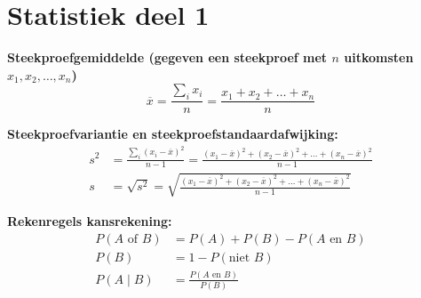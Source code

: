 \vspace{-2cm}
\section*{Statistiek deel 1}
\textbf{Steekproefgemiddelde (gegeven een steekproef met $n$ uitkomsten $x_1, x_2, \ldots, x_n$)}
\[
    \overline{x} = \frac{\sum_{i} x_i}{n} = \frac{x_1 + x_2 + \ldots + x_n}{n}
\]

\textbf{Steekproefvariantie en steekproefstandaardafwijking:}
\begin{align*}
    s^2 &= \frac{\sum_{i} (x_i-\overline{x})^2}{n-1} = \frac{(x_1-\overline{x})^2 + (x_2-\overline{x})^2 + \ldots + (x_n - \overline{x})^2}{n-1} \\ %
    s   &= \sqrt{s^2} = \sqrt{ \frac{(x_1-\overline{x})^2 + (x_2-\overline{x})^2 + \ldots + (x_n - \overline{x})^2}{n-1} }
\end{align*}

\textbf{Rekenregels kansrekening:}
\begin{align*}
    P(A \text{ of } B)      &= P(A) + P(B) - P(A \text{ en } B) \tag{optelregel}\\
    P(B)                    &= 1 - P(\text{niet } B) \tag{complementregel}\\
    P(A \mid B)         &= \frac{P(A \text{ en } B)}{P(B)} \tag{conditionele kansen}
\end{align*}

